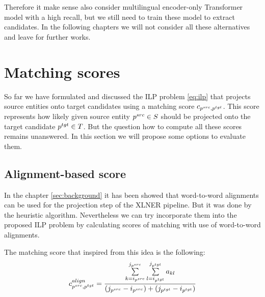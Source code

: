 Therefore it make sense also consider multilingual encoder-only Transformer model with a high recall,
but we still need to train these model to extract candidates. In the following chapters we will not consider all
these alternatives and leave for further works.

\section{Matching scores}
So far we have formulated and discussed the ILP problem \eqref{eq:ilp} that projects source entities onto
target candidates using a matching score \( c_{p^{src}, p^{tgt}} \). This score represents
how likely given source entity \( p^{src} \in S \) should be projected onto the target candidate \( p^{tgt} \in T \).
But the question how to compute all these scores remains unanswered. In this section we will propose
some options to evaluate them.

\subsection{Alignment-based score}
In the chapter \ref{sec:background} it has been showed that word-to-word alignments can be used
for the projection step of the XLNER pipeline. But it was done by the heuristic algorithm.
Nevertheless we can try incorporate them into the proposed ILP problem by calculating scores of matching with use of
word-to-word alignments.

The matching score that inspired from this idea is the following:
\begin{equation} \label{eq:align_cost}
    c_{p^{src}, p^{tgt}}^{align} =
    \frac{\sum\limits_{k=i_{p^{src}}}^{j_{p^{src}}} \sum\limits_{l=i_{p^{tgt}}}^{j_{p^{tgt}}} a_{kl}}
    {(j_{p^{src}} - i_{p^{src}}) + (j_{p^{tgt}} - i_{p^{tgt}})}
\end{equation}

